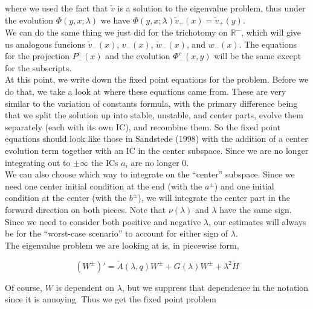 \documentclass[12pt]{article}
\def\R{{\mathbb R}}
\begin{document}
where we used the fact that $\tilde{v}$ is a solution to the eigenvalue problem, thus under the evolution $\Phi(y, x; \lambda)$ we have $\Phi(y, x; \lambda)\tilde{v}_+(x) = \tilde{v}_+(y)$.\\

We can do the same thing we just did for the trichotomy on $\R^-$, which will give us analogous funcions $\tilde{v}_-(x)$, $v_-(x)$, $\tilde{w}_-(x)$, and $w_-(x)$. The equations for the projection $P^c_-(x)$ and the evolution $\Phi^c_-(x,y)$ will be the same except for the subscripts.\\

At this point, we write down the fixed point equations for the problem. Before we do that, we take a look at where these equations came from. These are very similar to the variation of constants formula, with the primary difference being that we split the solution up into stable, unstable, and center parts, evolve them separately (each with its own IC), and recombine them. So the fixed point equations should look like those in Sandstede (1998) with the addition of a center evolution term together with an IC in the center subspace. Since we are no longer integrating out to $\pm \infty$ the ICs $a_i$ are no longer 0.\\

We can also choose which way to integrate on the ``center'' subspace. Since we need one center initial condition at the end (with the $a^\pm$) and one initial condition at the center (with the $b^\pm$), we will integrate the center part in the forward direction on both pieces. Note that $\nu(\lambda)$ and $\lambda$ have the same sign. Since we need to consider both positive and negative $\lambda$, our estimates will always be for the ``worst-case scenario'' to account for either sign of $\lambda$. \\

The eigenvalue problem we are looking at is, in piecewise form,

\[
(W^\pm)' = \tilde{A}(\lambda, q) W^\pm + G(\lambda)W^\pm + \lambda^2 \tilde{H}
\]

Of course, $W$ is dependent on $\lambda$, but we suppress that dependence in the notation since it is annoying. Thus we get the fixed point problem
\end{document}
